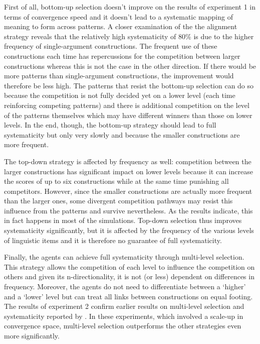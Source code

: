 First of all, bottom-up selection doesn't improve on the results of experiment 1 in terms of convergence speed and it doesn't lead to a systematic mapping of meaning to form across patterns. A closer examination of the the alignment strategy reveals that the relatively high systematicity of 80\% is due to the higher frequency of single-argument constructions. The frequent use of these constructions each time has repercussions for the competition between larger constructions whereas this is not the case in the other direction. If there would be more patterns than single-argument constructions, the improvement would therefore be less high. The patterns that resist the bottom-up selection can do so because the competition is not fully decided yet on a lower level (each time reinforcing competing patterns) and there is additional competition on the level of the patterns themselves which may have different winners than those on lower levels. In the end, though, the bottom-up strategy should lead to full systematicity but only very slowly and because the smaller constructions are more frequent.

The top-down strategy is affected by frequency as well: competition between the larger constructions has significant impact on lower levels because it can increase the scores of up to six constructions while at the same time punishing all competitors. However, since the smaller constructions are actually more frequent than the larger ones, some divergent competition pathways may resist this influence from the patterns and survive nevertheless. As the results indicate, this in fact happens in most of the simulations. Top-down selection thus improves systematicity significantly, but it is affected by the frequency of the various levels of linguistic items and it is therefore no guarantee of full systematicity.

Finally, the agents can achieve full systematicity through multi-level selection. This strategy allows the competition of each level to influence the competition on others and given its n-directionality, it is not (or less) dependent on differences in frequency. Moreover, the agents do not need to differentiate between a `higher' and a `lower' level but can treat all links between constructions on equal footing. The results of experiment 2 confirm earlier results on multi-level selection and systematicity reported by \citet{steels07multilevel}. In these experiments, which involved a scale-up in convergence space, multi-level selection outperforms the other strategies even more significantly.

